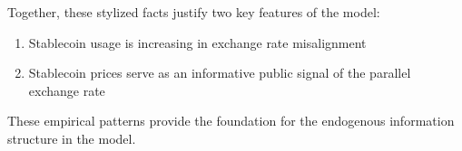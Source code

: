 Together, these stylized facts justify two key features of the model:

\begin{enumerate}
\item Stablecoin usage is increasing in exchange rate misalignment
\item Stablecoin prices serve as an informative public signal of the parallel exchange rate
\end{enumerate}

These empirical patterns provide the foundation for the endogenous information structure in the model.
